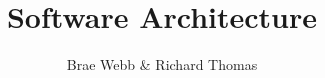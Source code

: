 \documentclass{csse4400}
\title{Software Architecture}
\author{Brae Webb \& Richard Thomas}
\date{\week{1}}
\begin{document}
\makecover





\end{document}
